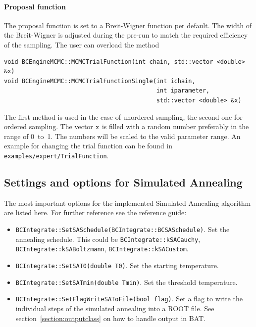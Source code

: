 \documentclass[11pt, a4paper]{article}
\begin{document}
\paragraph{Proposal function}

The proposal function is set to a Breit-Wigner function per
default. The width of the Breit-Wigner is adjusted during the pre-run
to match the required efficiency of the sampling. The user can
overload the method
%
\begin{verbatim}
void BCEngineMCMC::MCMCTrialFunction(int chain, std::vector <double> &x)
void BCEngineMCMC::MCMCTrialFunctionSingle(int ichain,
                                           int iparameter,
                                           std::vector <double> &x)
\end{verbatim}

The first method is used in the case of unordered sampling, the second
one for ordered sampling. The vector $\verb|x|$ is filled with a
random number preferably in the range of 0~to~1. The numbers will be
scaled to the valid parameter range. An example for changing the trial
function can be found in \verb|examples/expert/TrialFunction|.


\subsection{Settings and options for Simulated Annealing}
\label{section:settings:SA}

The most important options for the implemented Simulated Annealing
algorithm are listed here. For further reference see the reference
guide:
%
\begin{itemize}
\item \verb|BCIntegrate::SetSASchedule(BCIntegrate::BCSASchedule)|. Set the
  annealing schedule. This could be \verb|BCIntegrate::kSACauchy|,
  \verb|BCIntegrate::kSABoltzmann|, \verb|BCIntegrate::kSACustom|.
\item \verb|BCIntegrate::SetSAT0(double T0)|. Set the starting
  temperature.
\item \verb|BCIntegrate::SetSATmin(double Tmin)|. Set the threshold
  temperature.
\item \verb|BCIntegrate::SetFlagWriteSAToFile(bool flag)|. Set a flag to
 write the individual steps of the simulated annealing into a ROOT
 file. See section~\ref{section:outputclass} on how to handle output in
 BAT.
\end{itemize}
\end{document}
